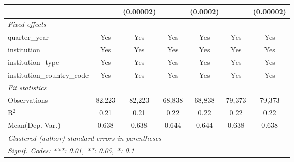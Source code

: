 \begin{tabular}{lcccccc}
                                      &               & (0.00002)     &               & (0.0002)      &               & (0.00002)\\   
   \midrule
   \emph{Fixed-effects}\\
   quarter\_year                      & Yes           & Yes           & Yes           & Yes           & Yes           & Yes\\  
   institution                        & Yes           & Yes           & Yes           & Yes           & Yes           & Yes\\  
   institution\_type                  & Yes           & Yes           & Yes           & Yes           & Yes           & Yes\\  
   institution\_country\_code         & Yes           & Yes           & Yes           & Yes           & Yes           & Yes\\  
   \midrule
   \emph{Fit statistics}\\
   Observations                       & 82,223        & 82,223        & 68,838        & 68,838        & 79,373        & 79,373\\  
   R$^2$                              & 0.21          & 0.21          & 0.22          & 0.22          & 0.22          & 0.22\\  
Mean(Dep. Var.) & 0.638 & 0.638 & 0.644 & 0.644 & 0.638 & 0.638 \\
   \midrule \midrule
   \multicolumn{7}{l}{\emph{Clustered (author) standard-errors in parentheses}}\\
   \multicolumn{7}{l}{\emph{Signif. Codes: ***: 0.01, **: 0.05, *: 0.1}}\\
\end{tabular}
\par\endgroup
